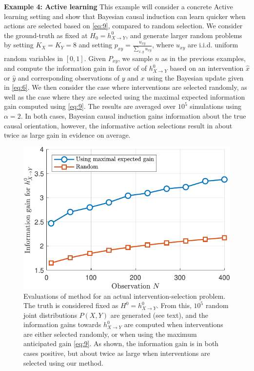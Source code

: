 \documentclass[letterpaper]{article} %
\begin{document}
\textbf{Example 4: Active learning} This example will consider a concrete Active learning setting and show that Bayesian causal induction can learn quicker when actions are selected based on \cref{eq:9}, compared to random selection. We consider the ground-truth as fixed at $H_0 = h^0_{X \rightarrow Y}$, and generate larger random problems by setting $K_X = K_Y  =8$ and setting $p_{xy} = \frac{u_{xy}}{\sum_{x,y} u_{xy}}$, where $u_{xy}$ are i.i.d. uniform random variables in $[0,1]$. Given $P_{xy}$, we sample $n$ as in the previous examples, and compute the information gain in favor of of $h^0_{X\rightarrow Y}$ based on an intervention $\hat x$ or $\hat y$ and corresponding observations of $y$ and $x$ using the Bayesian update given in \cref{eq:6}. We then consider the case where interventions are selected randomly,
as well as the case where
they are selected using the maximal expected information gain computed using \cref{eq:9}. The results are averaged over $10^5$ simulations using $\alpha=2$. In both cases, Bayesian causal induction gains information about the true causal orientation, however, the informative action selections result in about twice as large gain in evidence on average.




\begin{figure}[t!]
\centering
\includegraphics[width=.8\linewidth]{fig4xy-crop}
\caption{Evaluations of method for an actual intervention-selection problem. The truth is considered fixed as $H^0 = h^0_{X \rightarrow Y}$. From this, $10^5$ random joint distributions $P(X,Y)$ are generated (see text), and the information gains towards $h^0_{X \rightarrow Y}$ are computed when interventions are either selected randomly, or when using the maximum anticipated gain \cref{eq:9}. As shown, the information gain is in both cases positive, but about twice as large when interventions are selected using our method. }\label{fig5}
\end{figure}
\end{document}
